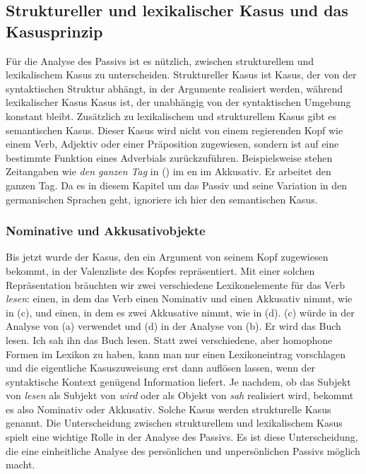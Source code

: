 \subsection{Struktureller und lexikalischer Kasus und das Kasusprinzip}
\label{sec-struk-lex-kas}
\label{sec-struc-lex-kas}

Für die Analyse des Passivs ist es nützlich, zwischen strukturellem und lexikalischem
Kasus zu unterscheiden. Struktureller Kasus ist Kasus, der von der syntaktischen Struktur abhängt, in der Argumente
realisiert werden, während lexikalischer Kasus Kasus ist, der unabhängig von der syntaktischen Umgebung konstant bleibt. Zusätzlich zu lexikalischem und strukturellem Kasus gibt es semantischen Kasus. Dieser Kasus wird nicht von einem
regierenden Kopf wie einem Verb, Adjektiv oder einer Präposition zugewiesen, sondern ist auf eine bestimmte Funktion eines
Adverbials zurückzuführen. Beispielsweise stehen Zeitangaben wie \emph{den ganzen Tag} in ()
im en im Akkusativ.
\ea
Er arbeitet den ganzen Tag.
\z
Da es in diesem Kapitel um das Passiv und seine Variation in den germanischen Sprachen geht, ignoriere ich hier den
semantischen Kasus.

\subsubsection{Nominative und Akkusativobjekte}

Bis jetzt wurde der Kasus, den ein Argument von seinem Kopf zugewiesen bekommt, in der Valenzliste des
Kopfes repräsentiert. Mit einer solchen Repräsentation bräuchten wir zwei verschiedene Lexikonelemente für das Verb
\emph{lesen}: einen, in dem das Verb einen Nominativ und einen Akkusativ nimmt, wie in
(c), und einen, in dem es zwei Akkusative nimmt, wie in (d). (c) würde in
der Analyse von (a) verwendet und (d) in der Analyse von (b).
\eal
\ex 
Er        wird das        Buch lesen.
\ex 
Ich sah ihn das Buch lesen.
\ex {}
\ex {}
\zl
Statt zwei verschiedene, aber homophone Formen im Lexikon zu haben, kann man nur einen Lexikoneintrag vorschlagen und die eigentliche
Kasuszuweisung erst dann auflösen lassen, wenn der syntaktische Kontext genügend Information liefert. Je
nachdem, ob das Subjekt von \emph{lesen} als
Subjekt von \emph{wird} oder als Objekt von \emph{sah} realisiert wird, bekommt es also Nominativ oder Akkusativ. Solche
Kasus werden strukturelle Kasus genannt. Die Unterscheidung zwischen strukturellem und lexikalischem Kasus spielt eine
wichtige Rolle in der Analyse des Passivs. Es ist diese Unterscheidung, die eine einheitliche Analyse des
persönlichen und unpersönlichen Passivs möglich macht.


